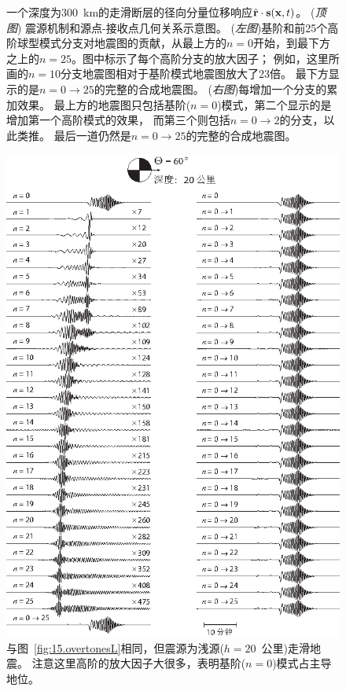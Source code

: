 \begin{figure}
\begin{center}
{}
\end{center}
\caption[overtonesR]{
\label{fig:15.overtonesR}
一个深度为$300$~km的走滑断层的径向分量位移响应$\hat{\bf r}\cdot{\bf s}({\bf x},t)$。
({\em 顶图\/}) 震源机制和源点-接收点几何关系示意图。
({\em 左图\/})基阶和前25个高阶球型模式分支对地震图的贡献，从最上方的$n=0$开始，到最下方之上的$n=25$。图中标示了每个高阶分支的放大因子；
例如，这里所画的$n = 10$分支地震图相对于基阶模式地震图放大了23倍。
最下方显示的是$n=0\!\rightarrow\!25$的完整的合成地震图。 
({\em 右图\/})每增加一个分支的累加效果。
最上方的地震图只包括基阶($n=0$)模式，第二个显示的是增加第一个高阶模式的效果，
而第三个则包括$n=0\!\rightarrow\!2$的分支，以此类推。
最后一道仍然是$n=0\!\rightarrow\!25$的完整的合成地震图。
}
\end{figure}
\begin{figure}[!t]
\begin{center}
\includegraphics{../figures/chap11/fig17.eps}
\end{center}
\caption[overtonesL2]{
\label{fig:15.overtonesL2}
与图~\ref{fig:15.overtonesL}相同，但震源为浅源($h=20$~公里)走滑地震。
注意这里高阶的放大因子大很多，表明基阶($n=0$)模式占主导地位。
}
\end{figure}
